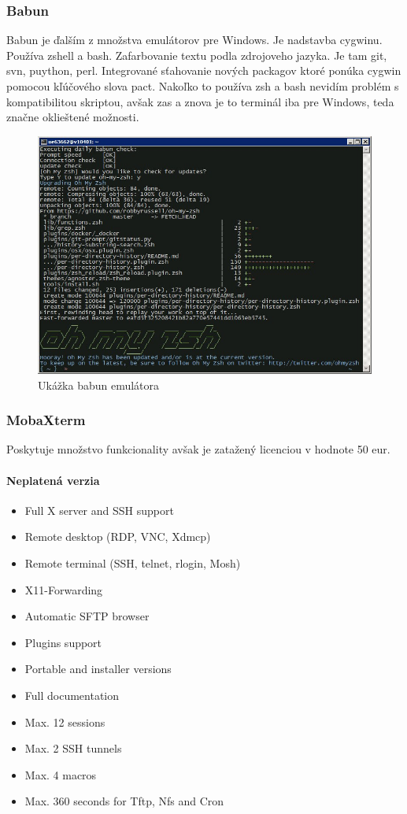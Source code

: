 \subsubsection{Babun}
\indent Babun je ďalším z množstva emulátorov pre Windows. Je nadstavba cygwinu. Používa zshell a bash. Zafarbovanie textu podla zdrojoveho jazyka. Je tam git, svn, puython, perl. Integrované sťahovanie nových packagov ktoré ponúka cygwin pomocou kľúčového slova pact. Nakoľko to používa zsh a bash nevidím problém s kompatibilitou skriptou, avšak zas a znova je to terminál iba pre Windows, teda značne oklieštené možnosti.
\begin{figure}[!htbp]
	\centering
	\includegraphics[width=15cm]{img/babun.jpeg}
	\caption{Ukážka babun emulátora}
	\label{fig:test}
\end{figure}
\subsubsection{MobaXterm}
\indent Poskytuje množstvo funkcionality avšak je zatažený licenciou v hodnote 50 eur. 
\paragraph{Neplatená verzia}
\begin{itemize}
	\item Full X server and SSH support
	\item Remote desktop (RDP, VNC, Xdmcp)
	\item Remote terminal (SSH, telnet, rlogin, Mosh)
	\item X11-Forwarding
	\item Automatic SFTP browser
	\item Plugins support
	\item Portable and installer versions
	\item Full documentation
	\item Max. 12 sessions
	\item Max. 2 SSH tunnels
	\item Max. 4 macros
	\item Max. 360 seconds for Tftp, Nfs and Cron
\end{itemize}

